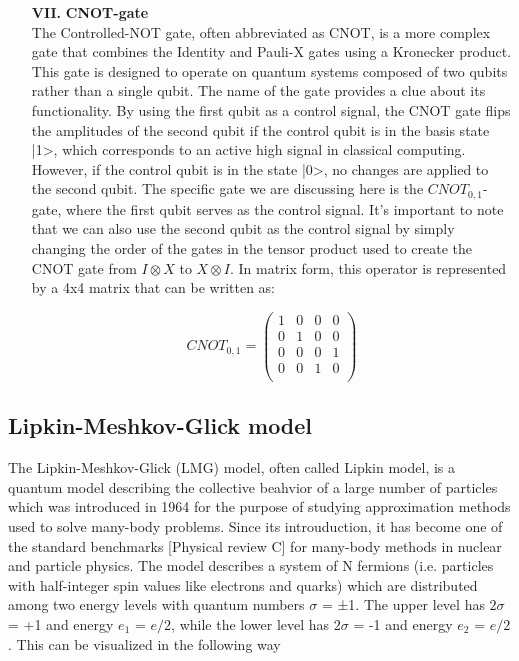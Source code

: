 \documentclass[onecolumn,10pt,cleanfoot]{asme2ej}
\begin{document}
\begin{enumerate}
	\item[\textbf{VII.}] \textbf{CNOT-gate} \\
		The Controlled-NOT gate, often abbreviated as CNOT, is a more complex gate that combines the Identity and Pauli-X gates using a Kronecker product. This gate is designed to operate on quantum systems composed of two qubits rather than a single qubit. The name of the gate provides a clue about its functionality. By using the first qubit as a control signal, the CNOT gate flips the amplitudes of the second qubit if the control qubit is in the basis state |1>, which corresponds to an active high signal in classical computing. However, if the control qubit is in the state |0>, no changes are applied to the second qubit. The specific gate we are discussing here is the $CNOT_{0,1}$-gate, where the first qubit serves as the control signal.
		It's important to note that we can also use the second qubit as the control signal by simply changing the order of the gates in the tensor product used to create the CNOT gate from $I \otimes X$ to $X \otimes I$. In matrix form, this operator is represented by a 4x4 matrix that can be written as:
		
		\begin{equation*}
		 CNOT_{0,1} = \begin{pmatrix}
			1 & 0 & 0 & 0 \\
			0 & 1 & 0 & 0 \\
			0 & 0 & 0 & 1 \\
			0 & 0 & 1 & 0 \\
		\end{pmatrix}
	\end{equation*}

\end{enumerate}


\subsection{Lipkin-Meshkov-Glick model}
The Lipkin-Meshkov-Glick (LMG) model, often called Lipkin model, is a quantum model describing the collective beahvior of a large number of particles which was introduced in 1964 for the purpose of studying approximation methods used to solve many-body problems. Since its introuduction, it has become one of the standard benchmarks [Physical review C] for many-body methods in nuclear and particle physics. The model describes a system of N fermions (i.e. particles with half-integer spin values like electrons and quarks) which are distributed among two energy levels with quantum numbers $\sigma$ = ±1. The upper level has $2\sigma$ = +1 and energy $e_{1}$ = $e/2$, while the lower level has $2\sigma$ = -1 and energy $e_{2}$ = $e/2$. This can be visualized in the following way
\end{document}
